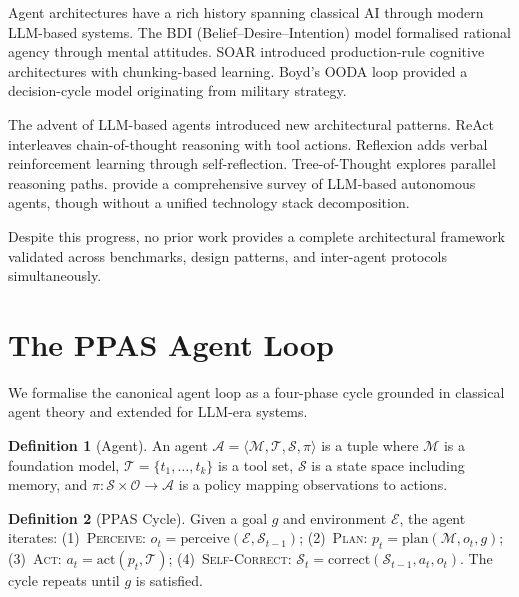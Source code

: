 \documentclass[sn-basic]{sn-jnl}
\theoremstyle{definition}
\newtheorem{definition}{Definition}
\begin{document}
Agent architectures have a rich history spanning classical AI through modern LLM-based systems. The BDI (Belief--Desire--Intention) model \citep{rao1995bdi} formalised rational agency through mental attitudes. SOAR \citep{laird2012soar} introduced production-rule cognitive architectures with chunking-based learning. Boyd's OODA loop \citep{boyd1987ooda} provided a decision-cycle model originating from military strategy.

The advent of LLM-based agents introduced new architectural patterns. ReAct \citep{yao2023react} interleaves chain-of-thought reasoning with tool actions. Reflexion \citep{shinn2023reflexion} adds verbal reinforcement learning through self-reflection. Tree-of-Thought \citep{yao2024tree} explores parallel reasoning paths. \citet{wang2024survey} provide a comprehensive survey of LLM-based autonomous agents, though without a unified technology stack decomposition.

Despite this progress, no prior work provides a complete architectural framework validated across benchmarks, design patterns, and inter-agent protocols simultaneously.

\section{The PPAS Agent Loop}\label{sec:ppas}

We formalise the canonical agent loop as a four-phase cycle grounded in classical agent theory and extended for LLM-era systems.

\begin{definition}[Agent]
An agent $\mathcal{A} = \langle \mathcal{M}, \mathcal{T}, \mathcal{S}, \pi \rangle$ is a tuple where $\mathcal{M}$ is a foundation model, $\mathcal{T} = \{t_1, \ldots, t_k\}$ is a tool set, $\mathcal{S}$ is a state space including memory, and $\pi: \mathcal{S} \times \mathcal{O} \rightarrow \mathcal{A}$ is a policy mapping observations to actions.
\end{definition}

\begin{definition}[PPAS Cycle]
Given a goal $g$ and environment $\mathcal{E}$, the agent iterates: (1)~\textsc{Perceive}: $o_t = \text{perceive}(\mathcal{E}, \mathcal{S}_{t-1})$; (2)~\textsc{Plan}: $p_t = \text{plan}(\mathcal{M}, o_t, g)$; (3)~\textsc{Act}: $a_t = \text{act}(p_t, \mathcal{T})$; (4)~\textsc{Self-Correct}: $\mathcal{S}_t = \text{correct}(\mathcal{S}_{t-1}, a_t, o_t)$. The cycle repeats until $g$ is satisfied.
\end{definition}
\end{document}
